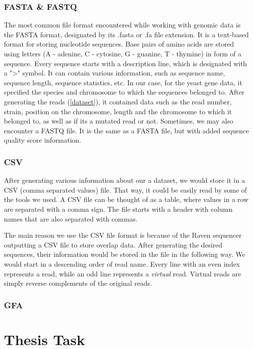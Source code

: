 \documentclass[times, utf8, diplomski, english]{fer_eng}
\begin{document}
\subsubsection{FASTA \& FASTQ}

The most common file format encountered while working with genomic data is the FASTA format, designated by its .fasta or .fa file extension. It is a text-based format for storing nucleotide sequences. Base pairs of amino acids are stored using letters (A - adenine, C - cytosine, G - guanine, T - thymine) in form of a sequence. Every sequence starts with a description line, which is designated with a ">" symbol. It can contain various information, such as sequence name, sequence length, sequence statistics, etc. In our case, for the yeast gene data, it specified the species and chromosome to which the sequences belonged to. After generating the reads (\ref{dataset}), it contained data such as the read number, strain, position on the chromosome, length and the chromosome to which it belonged to, as well as if its a mutated read or not. Sometimes, we may also encounter a FASTQ file. It is the same as a FASTA file, but with added sequence quality score information.

\subsubsection{CSV}

After generating various information about our a dataset, we would store it in a CSV (comma separated values) file. That way, it could be easily read by some of the tools we used. A CSV file can be thought of as a table, where values in a row are separated with a comma sign. The file starts with a header with column names that are also separated with commas.

The main reason we use the CSV file format is because of the Raven sequencer outputting a CSV file to store overlap data. After generating the desired sequences, their information would be stored in the file in the following way. We would start in a descending order of read name. Every line with an even index represents a read, while an odd line represents a \textit{virtual} read. Virtual reads are simply reverse complements of the original reads.

\subsubsection{GFA}

\section{Thesis Task}
\end{document}
